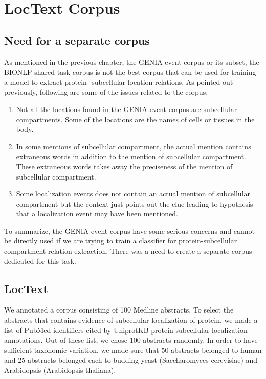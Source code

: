 \chapter{LocText Corpus}\label{chapter:corpus}

\section{Need for a separate corpus}

As mentioned in the previous chapter, the GENIA event corpus or its subset, the BIONLP shared task corpus is not the best corpus that can be used for training a model to extract protein- subcellular location relations. As pointed out previously, following are some of the issues related to the corpus:
\begin{enumerate}
\item Not all the locations found in the GENIA event corpus are subcellular compartments. Some of the locations are the names of cells or tissues in the body.
\item In some mentions of subcellular compartment, the actual mention contains extraneous words in addition to the mention of subcellular compartment. These extraneous words takes away the preciseness of the mention of subcellular compartment.
\item Some localization events does not contain an actual mention of subcellular compartment but the context just points out the clue leading to hypothesis that a localization event may have been mentioned.
\end{enumerate}

To summarize, the GENIA event corpus have some serious concerns and cannot be directly used if we are trying to train a classifier for protein-subcellular compartment relation extraction. There was a need to create a separate corpus dedicated for this task.

\section{LocText}

We annotated a corpus consisting of 100 Medline abstracts. To select the abstracts that contains evidence of subcellular localization of protein, we made a list of PubMed identifiers cited by UniprotKB protein subcellular localization annotations. Out of these list, we chose 100 abstracts randomly. In order to have sufficient taxonomic variation, we made sure that 50 abstracts belonged to human and 25 abstracts belonged each to budding yeast (Saccharomyces cerevisiae) and Arabidopsis (Arabidopsis thaliana).

